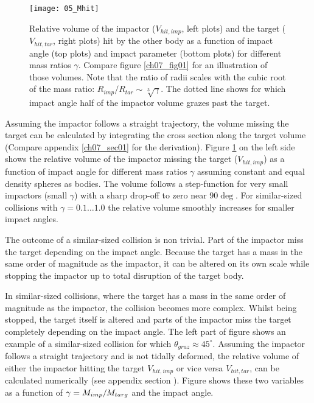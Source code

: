 \begin{figure}[htbp]
\begin{center}
\texttt{[image: 05\_Mhit]}
\caption{Relative volume of the impactor ($V_{hit, imp}$, left plots) and the target ($V_{hit, tar}$, right plots) hit by the other body as a function of impact angle (top plots) and impact parameter (bottom plots) for different mass ratios $\gamma$. Compare figure \ref{ch07_fig01} for an illustration of those volumes. Note that the ratio of radii scales with the cubic root of the mass ratio: $R_{imp} / R_{tar} \sim \sqrt[3]{\gamma}$. The dotted line shows for which impact angle half of the impactor volume grazes past the target. } 
\label{ch03_fig05}
\end{center}
\end{figure}

Assuming the impactor follows a straight trajectory, the volume missing the target can be calculated by integrating the cross section along the target volume (Compare appendix \ref{ch07_sec01} for the derivation). Figure \ref{ch03_fig05} on the left side shows the relative volume of the impactor missing the target ($V_{hit, imp}$) as a function of impact angle for different mass ratios $\gamma$ assuming constant and equal density spheres as bodies. The volume follows a step-function for very small impactors (small $\gamma$) with a sharp drop-off to zero near $90 \deg$. For similar-sized collisions with $\gamma = 0.1 \dots 1.0$ the relative volume smoothly increases for smaller impact angles. 

The outcome of a similar-sized collision is non trivial. Part of the impactor miss the target depending on the impact angle. Because the target has a mass in the same order of magnitude as the impactor, it can be altered on its own scale while stopping the impactor up to total disruption of the target body. 




In similar-sized collisions, where the target has a mass in the same order of magnitude as the impactor, the collision becomes more complex. Whilst being stopped, the target itself is altered and parts of the impactor miss the target completely depending on the impact angle. The left part of figure \label{ch03_fig03} shows an example of a similar-sized collision for which $\theta_{graz} \approx 45^\circ$. Assuming the impactor follows a straight trajectory and is not tidally deformed, the relative volume of either the impactor hitting the target $V_{hit, imp}$ or vice versa $V_{hit, tar}$, can be calculated numerically (see appendix section \label{ch07_sec01}). Figure shows these two variables as a function of $\gamma = M_{imp} / M_{targ}$ and the impact angle.

